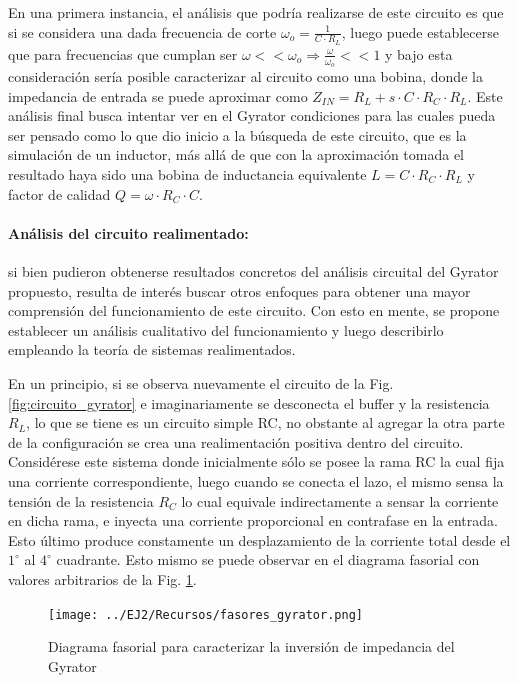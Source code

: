 En una primera instancia, el an\'alisis que podr\'ia realizarse de este circuito es que si se considera una dada frecuencia de corte 
$\omega_o = \frac{1}{C \cdot R_L}$, luego puede establecerse que para frecuencias que cumplan ser $\omega << \omega_o \Rightarrow \frac{\omega}{\omega_o} << 1$ y bajo esta consideraci\'on
ser\'ia posible caracterizar al circuito como una bobina, donde la impedancia de entrada se puede aproximar como $Z_{IN} = R_L + s \cdot C \cdot R_C \cdot R_L$. Este an\'alisis final busca
intentar ver en el Gyrator condiciones para las cuales pueda ser pensado como lo que dio inicio a la b\'usqueda de este circuito, que es la simulaci\'on de un inductor, m\'as all\'a de que con la aproximaci\'on tomada
el resultado haya sido una bobina de inductancia equivalente $L = C \cdot R_C \cdot R_L$ y factor de calidad $Q = \omega \cdot R_C \cdot C$.

\paragraph*{An\'alisis del circuito realimentado:} si bien pudieron obtenerse resultados concretos del an\'alisis circuital del Gyrator propuesto, resulta de inter\'es buscar otros enfoques
para obtener una mayor comprensi\'on del funcionamiento de este circuito. Con esto en mente, se propone establecer un an\'alisis cualitativo del funcionamiento y luego describirlo empleando
la teor\'ia de sistemas realimentados.

En un principio, si se observa nuevamente el circuito de la Fig. \ref{fig:circuito_gyrator} e imaginariamente se desconecta el buffer y la resistencia $R_L$, lo que se tiene es un circuito simple RC,
no obstante al agregar la otra parte de la configuraci\'on se crea una realimentaci\'on positiva dentro del circuito. Consid\'erese este sistema donde inicialmente s\'olo se posee la rama RC la cual fija una corriente correspondiente, luego cuando
se conecta el lazo, el mismo sensa la tensi\'on de la resistencia $R_C$ lo cual equivale indirectamente a sensar la corriente en dicha rama, e inyecta una corriente proporcional en contrafase en la entrada. Esto \'ultimo produce constamente un desplazamiento de la corriente
total desde el $1^{\circ}$ al $4^{\circ}$ cuadrante. Esto mismo se puede observar en el diagrama fasorial con valores arbitrarios de la Fig. \ref{fig:fasores_gyrator}.

\begin{figure}[H]
    \centering
    \texttt{[image: ../EJ2/Recursos/fasores\_gyrator.png]}
    \caption{Diagrama fasorial para caracterizar la inversi\'on de impedancia del Gyrator}
    \label{fig:fasores_gyrator}
\end{figure}

